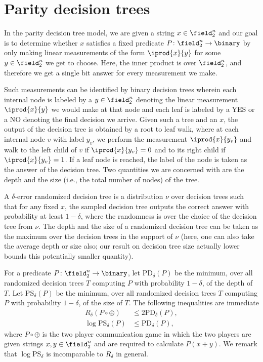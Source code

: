 \section{Parity decision trees}
\def\PD{\mathrm{PD}}
\def\PS{\mathrm{PS}}
In the parity decision tree model, we are given a string 
$x\in\field_2^n$ and our goal is to determine whether 
$x$ satisfies a fixed predicate
$P\colon\field_2^n\to\binary$ by only making linear 
measurements of the form $\iprod{x}{y}$ for some 
$y\in \field_2^n$ we get to choose. Here, the inner product
is over $\field_2^n$, and therefore we get a single bit 
answer for every measurement we make.

Such measurements can be identified by binary decision
trees wherein each internal node is labeled by a
$y\in\field_2^n$ denoting the linear measurement
$\iprod{x}{y}$ we would make at that node and each leaf
is labeled by a YES or a NO denoting the final decision we 
arrive. Given such a tree and an $x$, the output of the 
decision tree is obtained by a root to leaf walk, where at 
each internal node $v$ with label $y_v$, 
we perform the measurement 
$\iprod{x}{y_v}$ and walk to the left child of $v$ if 
$\iprod{x}{y_v}=0$ and to its right child if 
$\iprod{x}{y_v}=1$. If a leaf node is reached, 
the label of the node is taken as the answer of 
the decision tree. Two quantities we are concerned with
are the depth and the size (i.e., the total number of nodes)
of the tree.

A $\delta$-error randomized decision tree is a distribution
$\nu$ over decision trees such that for any fixed $x$, 
the sampled decision tree outputs the correct answer with 
probability at least $1-\delta$, where the randomness is over 
the choice of the decision tree from $\nu$. 
The depth and the size of a randomized decision tree can be 
taken as the maximum over the decision trees in the support 
of $\nu$ (here, one can also take the average depth or size also;
our result on decision tree size actually lower bounds this 
potentially smaller quantity).

For a predicate $P\colon\field_2^n\to\binary$, let 
$\PD_\delta(P)$ be the minimum, over all randomized decision 
trees $T$ computing $P$ with probability $1-\delta$, of the 
depth of $T$.
Let $\PS_\delta(P)$ be the minimum, over all randomized decision 
trees $T$ computing $P$ with probability $1-\delta$, of the 
size of $T$. The following inequalities are immediate
\begin{align}
  R_\delta(P\circ\oplus)&\le 2\PD_\delta(P)\label{eq:rvspd},\\
  \log\PS_\delta(P)&\le \PD_\delta(P)\nonumber,
\end{align}
where $P\circ \oplus$ is the two player communication game 
in which the two players are given strings $x,y\in\field_2^n$ 
and are required to calculate $P(x+y)$. 
We remark that $\log \PS_\delta$ is incomparable to $R_\delta$ 
in general.

